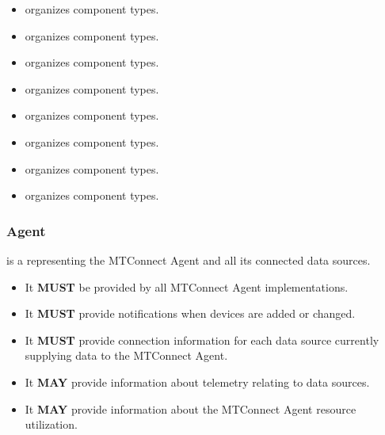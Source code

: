 \begin{itemize}

\item {} \newline {} \glspl{organize}  component types. 

\item {} \newline {} \glspl{organize}  component types. 

\item {} \newline {} \glspl{organize}  component types. 

\item {} \newline {} \glspl{organize}  component types. 

\item {} \newline {} \glspl{organize}  component types. 

\item {} \newline {} \glspl{organize}  component types. 

\item {} \newline {} \glspl{organize}  component types. 

\item {} \newline {} \glspl{organize}  component types. 
\end{itemize}



\subsubsection{Agent}
\label{sec:Agent}



 is a  representing the \gls{MTConnect Agent} and all its connected data sources.


\begin{itemize}
    \item It \textbf{MUST} be provided by all \gls{MTConnect Agent} implementations.
    \item It \textbf{MUST} provide notifications when devices are added or changed.
    \item It \textbf{MUST} provide connection information for each data source currently supplying data to the \gls{MTConnect Agent}.
    \item It \textbf{MAY} provide information about telemetry relating to data sources.
    \item It \textbf{MAY} provide information about the \gls{MTConnect Agent} resource utilization.
\end{itemize}
